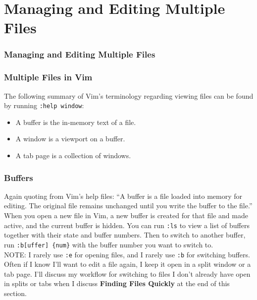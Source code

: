 \documentclass{beamer}
\begin{document}
\section{Managing and Editing Multiple Files}

\begin{frame}[fragile]
    \frametitle{Managing and Editing Multiple Files}
    \tableofcontents[currentsection]
\end{frame}

\begin{frame}[fragile]
	\frametitle{Multiple Files in Vim}
	\small
	The following summary of Vim's terminology regarding viewing files can be found by running \verb+:help window+:
	\begin{itemize}
		\item A buffer is the in-memory text of a file.
		\item A window is a viewport on a buffer.
		\item A tab page is a collection of windows.
	\end{itemize}
\end{frame}

\begin{frame}[fragile]
    \frametitle{Buffers}
    \small
	Again quoting from Vim's help files: \enquote{A buffer is a file loaded into memory for editing.  The original file remains unchanged until you write the buffer to the file.}\\
	\vspace{0.5cm}
	When you open a new file in Vim, a new buffer is created for that file and made active, and the current buffer is hidden. You can run \verb+:ls+ to view a list of buffers together with their state and buffer numbers. Then to switch to another buffer, run \verb+:b[uffer] {num}+ with the buffer number you want to switch to.\\
	\vspace{0.5cm}
	NOTE: I rarely use \verb+:e+ for opening files, and I rarely use \verb+:b+ for switching buffers. Often if I know I'll want to edit a file again, I keep it open in a split window or a tab page. I'll discuss my workflow for switching to files I don't already have open in splits or tabs when I discuss \textbf{Finding Files Quickly} at the end of this section.
\end{frame}
\end{document}
